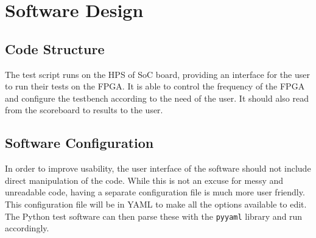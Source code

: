 \chapter{Software Design}

\section{Code Structure}
The test script runs on the HPS of SoC board, providing an interface for the user to run their tests on the FPGA.
It is able to control the frequency of the FPGA and configure the testbench according to the need of the user.
It should also read from the scoreboard to results to the user.

\section{Software Configuration}
In order to improve usability, the user interface of the software should not include direct manipulation of the code.
While this is not an excuse for messy and unreadable code, having a separate configuration file is much more user friendly.
This configuration file will be in YAML to make all the options available to edit.
The Python test software can then parse these with the \texttt{pyyaml} library and run accordingly.
